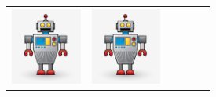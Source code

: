\documentclass{standalone}
\newcommand{\picHeight}{1in}
\begin{document}
\begin{tabular}{| c | c | c | c | c | c |}
            \includegraphics[height=\picHeight]{robot-character.jpg} &
            \includegraphics[height=\picHeight]{robot-character.jpg} &

\end{tabular}
\end{document}
